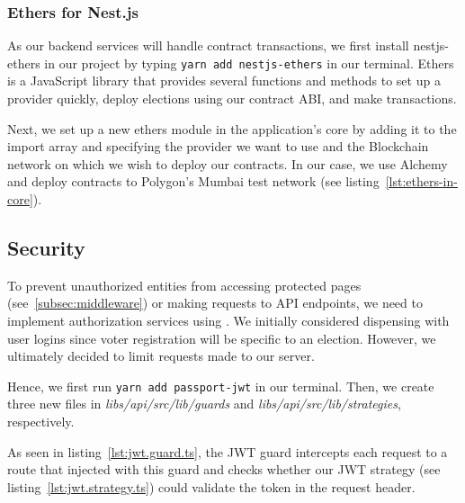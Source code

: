 \subsubsection{Ethers for Nest.js}

As our backend services will handle contract transactions, we first install nestjs-ethers in our project by typing \texttt{yarn add nestjs-ethers} in our terminal.
Ethers is a JavaScript library that provides several functions and methods to set up a provider quickly, deploy elections using our contract \gls{ABI}, and make transactions.

Next, we set up a new ethers module in the application's core by adding it to the import array and specifying the provider we want to use and the \gls{Blockchain} network on which we wish to deploy our contracts.
In our case, we use Alchemy and deploy contracts to Polygon’s Mumbai test network (see listing~\ref{lst:ethers-in-core}).


\subsection{Security}\label{subsec:security}

To prevent unauthorized entities from accessing protected pages (see~\ref{subsec:middleware}) or making requests to \gls{API} endpoints, we need to implement authorization services using .
We initially considered dispensing with user logins since voter registration will be specific to an election.
However, we ultimately decided to limit requests made to our server.

Hence, we first run \texttt{yarn add passport-jwt} in our terminal.
Then, we create three new files in \emph{libs/api/src/lib/guards} and \emph{libs/api/src/lib/strategies}, respectively.

As seen in listing~\ref{lst:jwt.guard.ts}, the \gls{JWT} guard intercepts each request to a route that injected with this guard and checks whether our \gls{JWT} strategy (see listing~\ref{lst:jwt.strategy.ts}) could validate the token in the request header.


